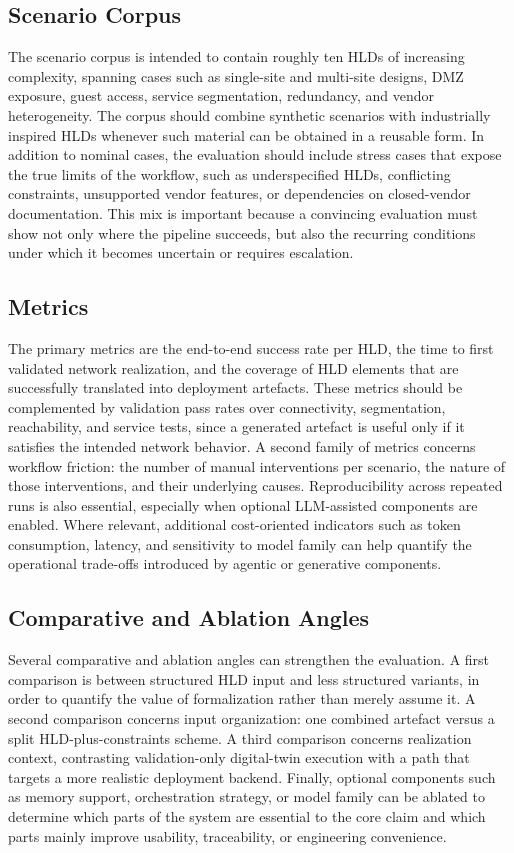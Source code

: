 \documentclass[conference]{IEEEtran}
\begin{document}
\subsection{Scenario Corpus}

The scenario corpus is intended to contain roughly ten HLDs of increasing complexity, spanning cases such as single-site and multi-site designs, DMZ exposure, guest access, service segmentation, redundancy, and vendor heterogeneity. The corpus should combine synthetic scenarios with industrially inspired HLDs whenever such material can be obtained in a reusable form. In addition to nominal cases, the evaluation should include stress cases that expose the true limits of the workflow, such as underspecified HLDs, conflicting constraints, unsupported vendor features, or dependencies on closed-vendor documentation. This mix is important because a convincing evaluation must show not only where the pipeline succeeds, but also the recurring conditions under which it becomes uncertain or requires escalation.

\subsection{Metrics}

The primary metrics are the end-to-end success rate per HLD, the time to first validated network realization, and the coverage of HLD elements that are successfully translated into deployment artefacts. These metrics should be complemented by validation pass rates over connectivity, segmentation, reachability, and service tests, since a generated artefact is useful only if it satisfies the intended network behavior. A second family of metrics concerns workflow friction: the number of manual interventions per scenario, the nature of those interventions, and their underlying causes. Reproducibility across repeated runs is also essential, especially when optional LLM-assisted components are enabled. Where relevant, additional cost-oriented indicators such as token consumption, latency, and sensitivity to model family can help quantify the operational trade-offs introduced by agentic or generative components.

\subsection{Comparative and Ablation Angles}

Several comparative and ablation angles can strengthen the evaluation. A first comparison is between structured HLD input and less structured variants, in order to quantify the value of formalization rather than merely assume it. A second comparison concerns input organization: one combined artefact versus a split HLD-plus-constraints scheme. A third comparison concerns realization context, contrasting validation-only digital-twin execution with a path that targets a more realistic deployment backend. Finally, optional components such as memory support, orchestration strategy, or model family can be ablated to determine which parts of the system are essential to the core claim and which parts mainly improve usability, traceability, or engineering convenience.
\end{document}
